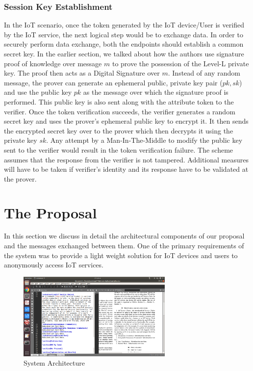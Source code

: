 \documentclass[journal]{IEEEtran}
\begin{document}
\subsubsection{Session Key Establishment}
In the IoT scenario, once the token generated by the IoT device/User is verified by the IoT service, the next logical step would be to exchange data. In order to securely perform data exchange, both the endpoints should establish a common secret key. In the earlier section, we talked about how the authors use signature proof of knowledge over message $m$ to prove the possession of the Level-L private key. The proof then acts as a Digital Signature over $m$. Instead of any random message, the prover can generate an ephemeral public, private key pair ($pk,sk$) and use the public key $pk$ as the message over which the signature proof is performed. This public key is also sent along with the attribute token to the verifier. Once the token verification succeeds, the verifier generates a random secret key and uses the prover's ephemeral public key to encrypt it. It then sends the encrypted secret key over to the prover which then decrypts it using the private key $sk$. Any attempt by a Man-In-The-Middle to modify the public key sent to the verifier would result in the token verification failure. The scheme assumes that the response from the verifier is not tampered. Additional measures will have to be taken if verifier's identity and its response have to be validated at the prover.

\section{The Proposal} \label{proposal}
In this section we discuss in detail the architectural components of our proposal and the messages exchanged between them. One of the primary requirements of the system was to provide a light weight solution for IoT devices and users to anonymously access IoT services. 

\begin{figure}[htbp]
\centerline{\includegraphics[width=3in]{dac.png}}
\caption{System Architecture}
\label{fig:sysarch}
\end{figure}
\end{document}
